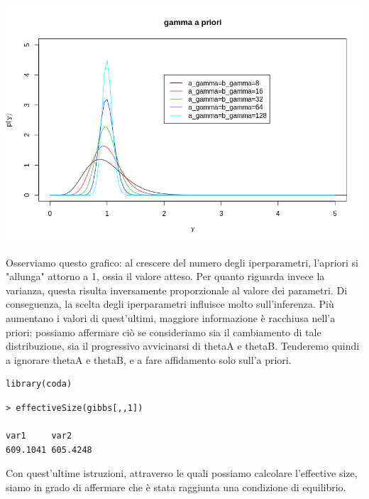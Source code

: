 \begin{enumerate}
\begin{center}
\includegraphics[width=\linewidth]{img/esercizio6-1-2}
\end{center}

Osserviamo questo grafico: al crescere del numero degli iperparametri, l'apriori si "allunga" attorno a 1,
ossia il valore atteso.
Per quanto riguarda invece la varianza, questa risulta inversamente proporzionale al valore dei parametri.
Di conseguenza, la scelta degli iperparametri influisce molto sull'inferenza.
Più aumentano i valori di quest'ultimi, maggiore informazione è racchiusa nell'a priori: possiamo affermare ciò se consideriamo sia il cambiamento di tale distribuzione, sia il progressivo avvicinarsi di thetaA e thetaB.
Tenderemo quindi a ignorare thetaA e thetaB, e a fare affidamento solo sull'a priori.

\begin{lstlisting}[style=R]
library(coda)
\end{lstlisting}

{
\color{red}
\begin{Verbatim}
> effectiveSize(gibbs[,,1])

var1     var2 
609.1041 605.4248 
\end{Verbatim}
}

Con quest'ultime istruzioni, attraverso le quali possiamo calcolare l'effective size, siamo in grado di affermare che è stata raggiunta una condizione di equilibrio.
\end{enumerate}